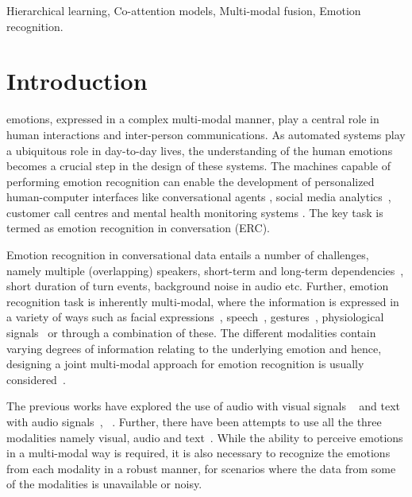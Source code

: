 \documentclass[lettersize,journal]{IEEEtran}
\begin{document}
\begin{IEEEkeywords}
Hierarchical learning, Co-attention models, Multi-modal fusion, Emotion recognition.
\end{IEEEkeywords}

\section{Introduction}
 emotions, expressed in a complex multi-modal manner, play a central role in human interactions and inter-person  communications. 
As automated systems play a ubiquitous role in day-to-day lives, the understanding of the human emotions becomes a crucial step in the design of these systems.  
The machines capable of performing emotion recognition can enable the development of personalized human-computer interfaces like conversational agents \cite{pantic2005affective}, social media analytics~\cite{gaind2019emotion}, customer call centres \cite{li2019acoustic} and  mental health monitoring systems \cite{ghosh2019emokey}. 
The key task is termed as emotion recognition in conversation (ERC).


Emotion recognition in conversational data entails a number of challenges, namely multiple (overlapping) speakers, short-term and long-term dependencies~\cite{poria2019emotion}, short duration of turn events, background noise in audio etc. Further, emotion recognition task is inherently multi-modal, where the information is expressed in a variety of ways such as facial expressions~\cite{tarnowski2017emotion}, speech~\cite{scherer2003vocal}, gestures~\cite{navarretta2012individuality}, physiological signals~\cite{knapp2011physiological} or through a combination of these. The different modalities contain varying degrees of information relating to the underlying emotion and hence, designing a joint multi-modal approach for  emotion recognition is usually considered~\cite{poria2017review}. 

The previous works have explored the use of  audio with visual signals ~\cite{kim2017isla,zhou2021information} and text with audio signals~\cite{yoon2018multimodal}, ~\cite{pepino2020fusion}. Further, there have been attempts to use all the three modalities namely visual, audio and text~\cite{mittal2020m3er}. While the ability to perceive emotions in a multi-modal way is required, it is also necessary to recognize the emotions from each modality in a robust manner, for scenarios where the data from some of the modalities is unavailable or noisy.
\end{document}
